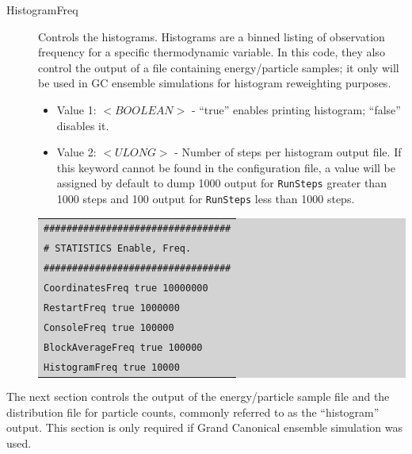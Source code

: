 \begin{description}
\item [HistogramFreq] Controls the histograms. Histograms are a binned listing of observation frequency for a specific thermodynamic variable.  In this code, they also control the output of a file containing energy/particle samples; it only will be used in GC ensemble simulations for histogram reweighting purposes.
	\begin{itemize}
	\item Value 1: $<BOOLEAN>$ - ``true'' enables printing histogram; ``false'' disables it.
	\item Value 2: $<ULONG>$ - Number of steps per histogram output file. If this keyword cannot be found in the configuration file, a value will be assigned by default to dump 1000 output for \texttt{RunSteps} greater than 1000 steps and 100 output for \texttt{RunSteps} less than 1000 steps.
	\end{itemize}
	
	\colorbox{lightgray}{
	\begin{tabular}{l}
	\texttt{\#\#\#\#\#\#\#\#\#\#\#\#\#\#\#\#\#\#\#\#\#\#\#\#\#\#\#\#\#\#\#\#\#}\\
	\texttt{\#  STATISTICS  Enable,  Freq.}\\
	\texttt{\#\#\#\#\#\#\#\#\#\#\#\#\#\#\#\#\#\#\#\#\#\#\#\#\#\#\#\#\#\#\#\#\#}\\
	\texttt{CoordinatesFreq   	 true   10000000}\\
	\texttt{RestartFreq  	  	 true   1000000}\\
	\texttt{ConsoleFreq       	 true   100000}\\
	\texttt{BlockAverageFreq  	 true   100000}\\
	\texttt{HistogramFreq  	 true   10000}\\
	\end{tabular}}
\end{description}
The next section controls the output of the energy/particle sample file and the distribution file for particle counts, commonly referred to as the ``histogram'' output. This section is only required if Grand Canonical ensemble simulation was used.
